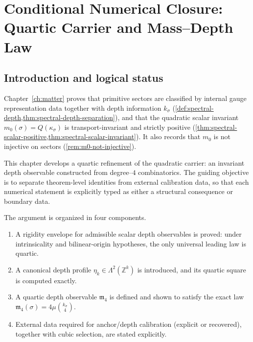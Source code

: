 \chapter{Conditional Numerical Closure: Quartic Carrier and Mass--Depth Law}
\label{ch:matter-numbers}

\begin{chapterorientation}
\end{chapterorientation}
\section{Introduction and logical status}
\label{sec:numbers-intro}

Chapter~\ref{ch:matter} proves that primitive sectors are classified by
internal gauge representation data together with depth information
\(k_\sigma\) (\cref{def:spectral-depth,thm:spectral-depth-separation}),
and that the quadratic scalar invariant
\(m_0(\sigma)=Q(\kappa_\sigma)\) is transport-invariant and strictly
positive (\cref{thm:spectral-scalar-positive,thm:spectral-scalar-invariant}).
It also records that \(m_0\) is not injective on sectors
(\cref{rem:m0-not-injective}).

This chapter develops a quartic refinement of the quadratic carrier:
an invariant depth observable constructed from degree--\(4\) combinatorics.
The guiding objective is to separate theorem-level identities from
external calibration data, so that each numerical statement is
explicitly typed as either a structural consequence or boundary data.

The argument is organized in four components.
\begin{enumerate}[label=\textup{(\roman*)}]
\item A rigidity envelope for admissible scalar depth observables is proved:
      under intrinsicality and bilinear-origin hypotheses, the only universal
      leading law is quartic.
\item A canonical depth profile \(\eta_k\in\Lambda^2(\mathbb Z^k)\) is
      introduced, and its quartic square is computed exactly.
\item A quartic depth observable \(\mathfrak m_4\) is defined and shown to
      satisfy the exact law
      \(\mathfrak m_4(\sigma)=4\mu\binom{k_\sigma}{4}\).
\item External data required for anchor/depth calibration (explicit or
      recovered), together with cubic selection,
      are stated explicitly.
\end{enumerate}

